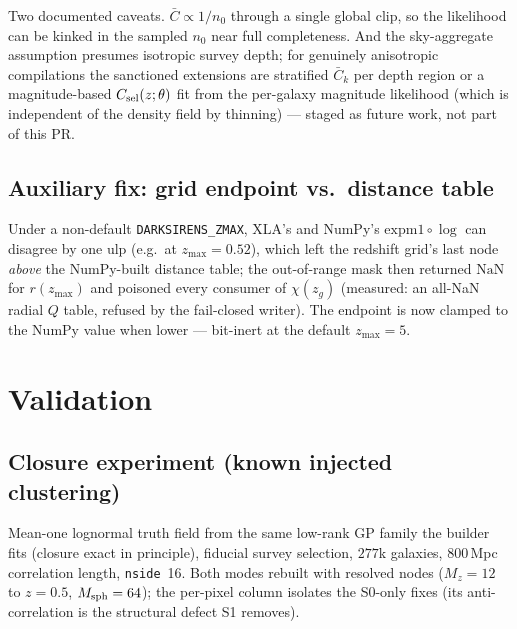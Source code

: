 \documentclass[11pt]{article}
\newcommand{\Cbar}{\bar{C}}
\begin{document}
Two documented caveats. $\Cbar \propto 1/n_0$ through a single global clip, so the
likelihood can be kinked in the sampled $n_0$ near full completeness. And the
sky-aggregate assumption presumes isotropic survey depth; for genuinely anisotropic
compilations the sanctioned extensions are stratified $\Cbar_k$ per depth region or
a magnitude-based $C_{\rm sel}(z;\theta)$ fit from the per-galaxy magnitude
likelihood (which is independent of the density field by thinning) --- staged as
future work, not part of this PR.

\subsection{Auxiliary fix: grid endpoint vs.\ distance table}

Under a non-default \texttt{DARKSIRENS\_ZMAX}, XLA's and NumPy's
$\mathrm{expm1}\circ\log$ can disagree by one ulp (e.g.\ at $z_{\max} = 0.52$), which
left the redshift grid's last node \emph{above} the NumPy-built distance table; the
out-of-range mask then returned $\mathrm{NaN}$ for $r(z_{\max})$ and poisoned every
consumer of $\chi(z_g)$ (measured: an all-NaN radial $Q$ table, refused by the
fail-closed writer). The endpoint is now clamped to the NumPy value when lower ---
bit-inert at the default $z_{\max} = 5$.

\section{Validation}
\label{sec:closure}

\subsection{Closure experiment (known injected clustering)}

Mean-one lognormal truth field from the same low-rank GP family the builder fits
(closure exact in principle), fiducial survey selection, $277$k galaxies, $800\,$Mpc
correlation length, \texttt{nside}~16. Both modes rebuilt with resolved nodes
($M_z = 12$ to $z = 0.5$, $M_{\rm sph} = 64$); the per-pixel column isolates the
S0-only fixes (its anti-correlation is the structural defect S1 removes).
\end{document}
